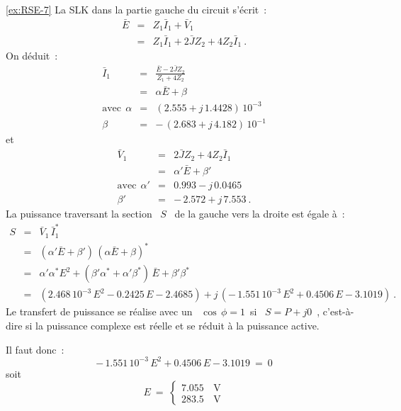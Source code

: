 \begin{solexercise}{\ref{ex:RSE-7}}
La SLK dans la partie gauche du circuit s'écrit~:
\begin{eqnarray*}
	\bar{E} &=& Z_1\bar{I}_1 + \bar{V}_1\\
	&=& Z_1 \bar{I}_1 + 2\bar{J}Z_2 + 4Z_2\bar{I}_1~.
\end{eqnarray*}
On déduit~:
\begin{eqnarray*}
	\bar{I}_1 &=& \frac{\bar{E} - 2\bar{J} Z_2}{Z_1 + 4Z_2}\\
	&=& \alpha \bar{E} + \beta\\
	\mbox{avec} ~~\alpha &=& (2.555 + j \, 1.4428) \, 10^{-3}\\
	\beta &=& -\, (2.683 + j\, 4.182)\, 10^{-1}
\end{eqnarray*}
et
\begin{eqnarray*}
	\bar{V}_1 &=& 2\bar{J}Z_2 + 4Z_2\bar{I}_1\\
	&=& \alpha ' \bar{E} + \beta '\\
	\mbox{avec} ~~\alpha ' &=& 0.993 - j \, 0.0465\\
	\beta ' &=& -\, 2.572 + j\, 7.553~.
\end{eqnarray*}
La puissance traversant la section \ $S$ \ de la gauche vers la droite est égale à~:
\begin{eqnarray*}
	S &=& \bar{V}_1 \, \bar{I}_1^{\ast}\\
	&=& (\alpha ' \bar{E} + \beta ')\, (\alpha \bar{E} + \beta )^{\ast}\\
	&=& \alpha ' \alpha^{\ast} E^2 + 
	(\beta ' \alpha^{\ast} + \alpha ' \beta^{\ast})\, \bar{E} + \beta ' \beta^{\ast}\\
	&=& (2.468 \, 10^{-3} \, E^2 - 0.2425\, E - 2.4685) 
	+ j\, (-\, 1.551\, 10^{-3} \, E^2 + 0.4506\, E - 3.1019)~.
\end{eqnarray*}
Le transfert de puissance se réalise avec un \ $\cos \,\phi = 1$\ si \
$S = P+j0$~, c'est-à-dire si la puissance complexe est réelle et se
réduit à la puissance active.

Il faut donc~:
\[ -\, 1.551\, 10^{-3} \, E^2 + 0.4506\, E - 3.1019 \: = \: 0 \]
soit
\[ E \: = \: 
\begin{cases}
7.055\, & \text{V} \\
283.5\, & \text{V}
\end{cases}\]


\end{solexercise}
